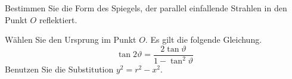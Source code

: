 \begin{atiTask}[
  title = {Spieglein, Spieglein...}
]
  Bestimmen Sie die Form des Spiegels, der parallel einfallende Strahlen in den Punkt $O$ reflektiert.

  \begin{atiNote}
    Wählen Sie den Ursprung im Punkt $O$.
    Es gilt die folgende Gleichung.
    \[
      \tan 2ϑ = \frac{2\tan ϑ}{1-\tan^2 ϑ}
    \]
    Benutzen Sie die Substitution $y^2 = r^2 - x^2$.
  \end{atiNote}
\end{atiTask}